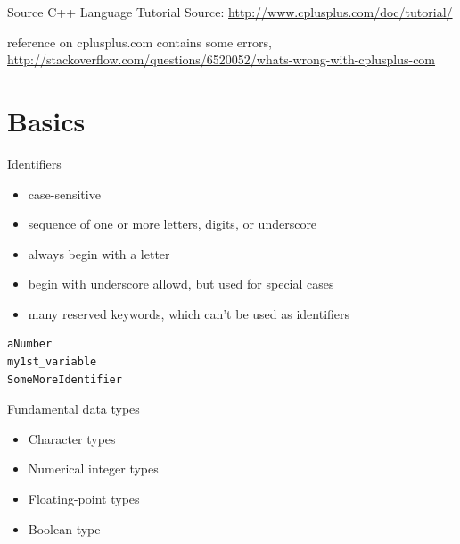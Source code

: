 \documentclass{beamer}
\begin{document}
\begin{frame}{Source}
C++ Language Tutorial
Source: \url{http://www.cplusplus.com/doc/tutorial/}
\begin{block}

reference on cplusplus.com contains some errors,
\url{http://stackoverflow.com/questions/6520052/whats-wrong-with-cplusplus-com}
\end{block}
\end{frame}

\section{Basics}

\begin{frame}[fragile]{Identifiers}
\begin{itemize}
  \item case-sensitive
  \item sequence of one or more letters, digits, or underscore
  \item always begin with a letter
  \item begin with underscore allowd, but used for special cases
  \item many reserved keywords, which can't be used as identifiers 
\end{itemize}
\begin{lstlisting}[caption=Identifiers Examples]
aNumber
my1st_variable
SomeMoreIdentifier
\end{lstlisting}
\end{frame}

\begin{frame}{Fundamental data types}
\begin{itemize}
  \item Character types
  \item Numerical integer types
  \item Floating-point types
  \item Boolean type
\end{itemize}
\end{frame}
\end{document}
